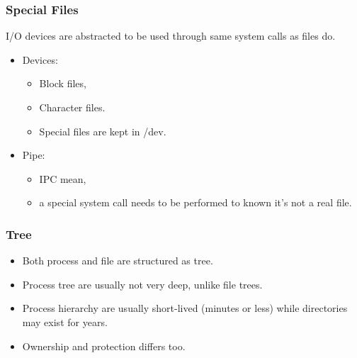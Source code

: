   \begin{frame}
    \frametitle{Special Files}
      I/O devices are abstracted to be used through same system calls as files do.
      \begin{itemize}
        \item Devices:
          \begin{itemize}
            \item Block files,
            \item Character files.
            \item Special files are kept in /dev.
          \end{itemize}
        \item Pipe:
          \begin{itemize}
            \item IPC mean,
            \item a special system call needs to be performed to known it's not a real file.
          \end{itemize}
      \end{itemize}
  \end{frame}

  \begin{frame}
    \frametitle{Tree}
      \begin{itemize}
        \item Both process and file are structured as tree.
        \item Process tree are usually not very deep, unlike file trees.
        \item Process hierarchy are usually short-lived (minutes or less) while directories may exist for years.
        \item Ownership and protection differs too.
      \end{itemize}
  \end{frame}

